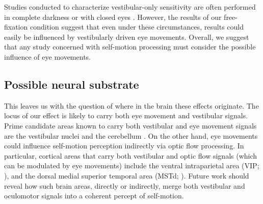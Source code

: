Studies conducted to characterize vestibular-only sensitivity are often performed in complete darkness or with closed eyes \cite{grabherr2008,macneilage2010b,macneilage2010a,roditi2012,valko2012,nesti2014}. However, the results of our free-fixation condition suggest that even under these circumstances, results could easily be influenced by vestibularly driven eye movements. Overall, we suggest that any study concerned with self-motion processing must consider the possible influence of eye movements.

\subsection{Possible neural substrate}

This leaves us with the question of where in the brain these effects originate. The locus of our effect is likely to carry both eye movement and vestibular signals. Prime candidate areas known to carry both vestibular and eye movement signals are the vestibular nuclei \cite{henn1975,daunton1979} and the cerebellum \cite{waespe1981}. On the other hand, eye movements could influence self-motion perception indirectly via optic flow processing. In particular, cortical areas that carry both vestibular and optic flow signals (which can be modulated by eye movements) include the ventral intraparietal area (VIP; \cite{bremmer2002,chen2011}), and the dorsal medial superior temporal area (MSTd; \cite{gu2008}). Future work should reveal how such brain areas, directly or indirectly, merge both vestibular and oculomotor signals into a coherent percept of self-motion.

